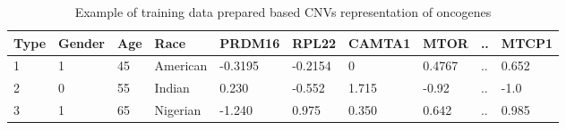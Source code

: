 
\vspace{-3mm}
\begin{table} [!ht]
    \caption{Example of training data prepared based CNVs representation of oncogenes}
    \label{cnv:changed232d}
    \vspace{-6mm}
    \begin{center}
        \scriptsize
        \begin{tabular}{l|l|l| l|l|l|l|l|l|l}
            \hline
            \rowcolor{Gray}
            \textbf{Type} & \textbf{Gender} & Age & Race & \textbf{PRDM16} & \textbf{RPL22} & \textbf{CAMTA1} & \textbf{MTOR} & .. & \textbf{MTCP1} \\\hline    
            1 & 1 & 45 & American & -0.3195 & -0.2154 & 0 & 0.4767  & .. & 0.652 \\\hline
            2 & 0 & 55 & Indian & 0.230 & -0.552 & 1.715 & -0.92  & .. & -1.0 \\\hline
            3 & 1 & 65 & Nigerian & -1.240 & 0.975 & 0.350 & 0.642  & .. & 0.985 \\\hline
        \end{tabular}
        \vspace{-6mm}
    \end{center}
\end{table}
\vspace{-3mm}

